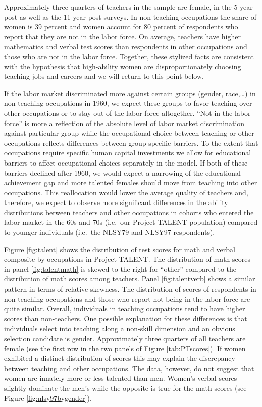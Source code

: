 \documentclass[onehalfspacing,11pt]{article}
\begin{document}
Approximately three quarters of teachers in the sample are female, in the 5-year post as well as the 11-year post surveys. In non-teaching occupations the share of women is 39 percent and women account for 80 percent of respondents who report that they are not in the labor force. On average, teachers have higher mathematics and verbal test scores than respondents in other occupations and those who are not in the labor force. Together, these stylized facts are consistent with the hypothesis that high-ability women are disproportionately choosing teaching jobs and careers and we will return to this point below.
	
If the labor market discriminated more against certain groups (gender, race,\ldots) in non-teaching occupations in 1960, we expect these groups to favor teaching over other occupations or to stay out of the labor force altogether. ``Not in the labor force'' is more a reflection of the absolute level of labor market discrimination against particular group while the occupational choice between teaching or other occupations reflects differences between group-specific barriers. To the extent that occupations require specific human capital investments we allow for educational barriers to affect occupational choices separately in the model. If both of these barriers declined after 1960, we would expect a narrowing of the educational achievement gap and more talented females should move from teaching into other occupations. This reallocation would lower the average quality of teachers and, therefore, we expect to observe more significant differences in the ability distributions between teachers and other occupations in cohorts who entered the labor market in the 60s and 70s (i.e.~our Project TALENT population) compared to younger individuals (i.e.~the NLSY79 and NLSY97 respondents).

Figure \ref{fig:talent} shows the distribution of test scores for math and verbal composite by occupations in Project TALENT. The distribution of math scores in panel \ref{fig:talentmath} is skewed to the right for ``other'' compared to the distribution of math scores among teachers. Panel \ref{fig:talentverb} shows a similar pattern in terms of relative skewness. The distribution of scores of respondents in non-teaching occupations and those who report not being in the labor force are quite similar. Overall, individuals in teaching occupations tend to have higher scores than non-teachers. One possible explanation for these differences is that individuals select into teaching along a non-skill dimension and an obvious selection candidate is gender. Approximately three quarters of all teachers are female (see the first row in the two panels of Figure \ref{tab:PTscores}). If women exhibited a distinct distribution of scores this may explain the discrepancy between teaching and other occupations. The data, however, do not suggest that women are innately more or less talented than men. Women's verbal scores slightly dominate the men's while the opposite is true for the math scores (see Figure \ref{fig:nlsy97bygender}).
\end{document}
